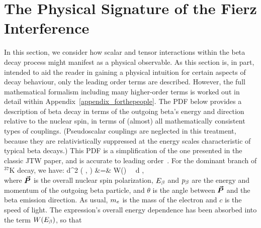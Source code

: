 \section{The Physical Signature of the Fierz Interference}
\label{sec:mathdescription_intro}
In this section, we consider how scalar and tensor interactions within the beta decay process might manifest as a physical observable.  As this section is, in part, intended to aid the reader in gaining a physical intuition for certain aspects of decay behaviour, only the leading order terms are described. However, the full mathematical formalism including many higher-order terms is worked out in detail within Appendix~\ref{appendix_forthepeople}.
The \ac{PDF} below provides a description of beta decay in terms of the outgoing beta's energy and direction relative to the nuclear spin, in terms of (almost) all mathematically consistent types of couplings. (Pseudoscalar couplings are neglected in this treatment, because they are relativistically suppressed at the energy scales characteristic of typical beta decays.)  This \ac{PDF} is a simplification of the one presented in the classic \ac{JTW} paper, and is accurate to leading order~\cite{jtw,jtw_coulomb,EbelFeldman1957}.  For the dominant branch of $^{37}$K decay, we have:
\bea
	\textrm{d}^2 \Gamma  ( \Ebeta, \theta ) 
	&=&
	W(\Ebeta)  \, \dEe \, \textrm{d} \theta , 
\nonumber \\
\label{equation:integrated_jtw_INTRODUCTION}
\eea
where $\bm{\vec{P}}$ is the overall nuclear spin polarization, $E_{\beta}$ and $p_{\beta}$ are the energy and momentum of the outgoing beta particle, and $\theta$ is the angle between $\bm{\vec{P}}$ and the beta emission direction.  
As usual, $m_e$ is the mass of the electron and $c$ is the speed of light.
The expression's overall energy dependence has been absorbed into the term $W(E_{\beta})$, so that
